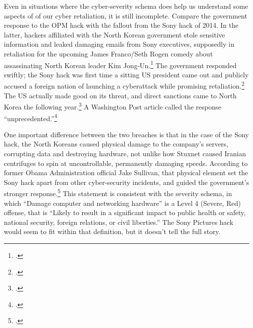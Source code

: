 \documentclass{report}
\begin{document}
\begin{refsegment}
Even in situations where the cyber-severity schema does help us understand some aspects of of our cyber retaliation, it is still incomplete. Compare the government response to the OPM hack with the fallout from the Sony hack of 2014. In the latter, hackers affiliated with the North Korean government stole sensitive information and leaked damaging emails from Sony executives, supposedly in retaliation for the upcoming James Franco/Seth Rogen comedy about assassinating North Korean leader Kim Jong-Un.\footcite{barnes_sony_2017} The government responded swiftly; the Sony hack was first time a sitting US president came out and publicly accused a foreign nation of launching a cyberattack while promising retaliation.\footcite{sanger_u.s._2016} The US actually made good on its threat, and direct sanctions came to North Korea the following year.\footcite{lederman_us_2015} A Washington Post article called the response ``unprecedented.''\footcite{nakashima_why_2015}

One important difference between the two breaches is that in the case of the Sony hack, the North Koreans caused physical damage to the company's servers, corrupting data and destroying hardware, not unlike how Stuxnet caused Iranian centrifuges to spin at uncontrollable, permanently damaging speeds. According to former Obama Administration official Jake Sullivan, that physical element set the Sony hack apart from other cyber-security incidents, and guided the government's stronger response.\footcite[Jake Sullivan served as the Deputy Assistant to the President and National Security Advisor to the Vice President. Piror to that, he was the Director of Policy Planning at the State Department.]{sullivan_personal_2019} This statement is consistent with the severity schema, in which ``Damage computer and networking hardware'' is a Level 4 (Severe, Red) offense, that is ``Likely to result in a significant impact to public health or safety, national security, foreign relations, or civil liberties.'' The Sony Pictures hack would seem to fit within that definition, but it doesn't tell the full story.


\end{refsegment}
\end{document}
